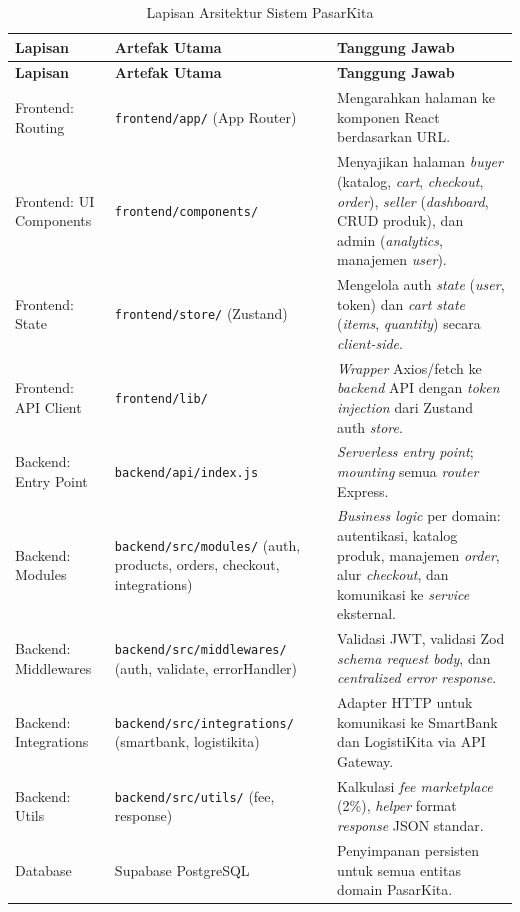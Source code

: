 \begin{longtable}{|L{3.5cm}|L{5cm}|L{6.5cm}|}
    \caption{Lapisan Arsitektur Sistem PasarKita}
    \label{tab:arsitektur} \\
    \hline
    \textbf{Lapisan} & \textbf{Artefak Utama} & \textbf{Tanggung Jawab} \\
    \hline
    \endfirsthead
    \hline
    \textbf{Lapisan} & \textbf{Artefak Utama} & \textbf{Tanggung Jawab} \\
    \hline
    \endhead
    \hline
    \endfoot
    Frontend: Routing
        & \texttt{frontend/app/} (App Router)
        & Mengarahkan halaman ke komponen React berdasarkan URL. \\
    \hline
    Frontend: UI Components
        & \texttt{frontend/components/}
        & Menyajikan halaman \textit{buyer} (katalog, \textit{cart},
          \textit{checkout}, \textit{order}), \textit{seller}
          (\textit{dashboard}, CRUD produk), dan admin
          (\textit{analytics}, manajemen \textit{user}). \\
    \hline
    Frontend: State
        & \texttt{frontend/store/} (Zustand)
        & Mengelola auth \textit{state} (\textit{user}, token) dan \textit{cart
          state} (\textit{items}, \textit{quantity}) secara \textit{client-side}. \\
    \hline
    Frontend: API Client
        & \texttt{frontend/lib/}
        & \textit{Wrapper} Axios/fetch ke \textit{backend} API dengan \textit{token
          injection} dari Zustand auth \textit{store}. \\
    \hline
    Backend: Entry Point
        & \texttt{backend/api/index.js}
        & \textit{Serverless entry point}; \textit{mounting} semua \textit{router}
          Express. \\
    \hline
    Backend: Modules
        & \texttt{backend/src/modules/} (auth, products, orders, checkout,
          integrations)
        & \textit{Business logic} per domain: autentikasi, katalog produk,
          manajemen \textit{order}, alur \textit{checkout}, dan komunikasi ke
          \textit{service} eksternal. \\
    \hline
    Backend: Middlewares
        & \texttt{backend/src/middlewares/} (auth, validate, errorHandler)
        & Validasi JWT, validasi Zod \textit{schema request body}, dan
          \textit{centralized error response}. \\
    \hline
    Backend: Integrations
        & \texttt{backend/src/integrations/} (smartbank, logistikita)
        & Adapter HTTP untuk komunikasi ke SmartBank dan LogistiKita via API
          Gateway. \\
    \hline
    Backend: Utils
        & \texttt{backend/src/utils/} (fee, response)
        & Kalkulasi \textit{fee marketplace} (2\%), \textit{helper} format
          \textit{response} JSON standar. \\
    \hline
    Database
        & Supabase PostgreSQL
        & Penyimpanan persisten untuk semua entitas domain PasarKita. \\
    \hline
\end{longtable}

